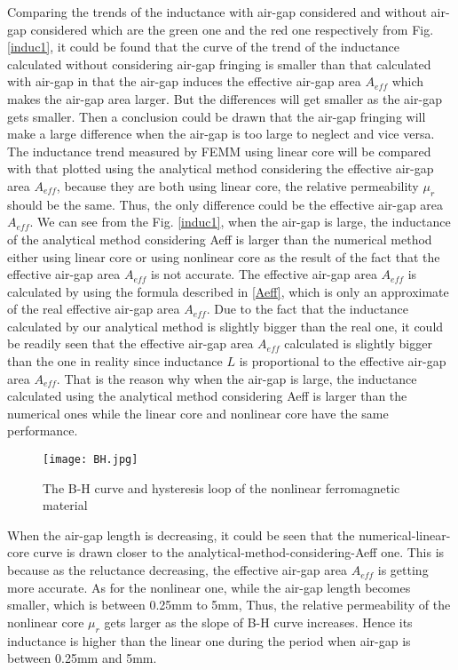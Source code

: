 \documentclass[a4paper]{IEEEtran}
\begin{document}
{Comparing the trends of the inductance with air-gap considered and without air-gap considered which are the green one and the red one respectively from Fig. {\ref{induc1}}, 
it could be found that the curve of the trend of the inductance calculated without considering air-gap fringing is smaller than that calculated with air-gap in that the air-gap induces the effective air-gap area $A_{eff}$ which makes the air-gap area larger. 
But the differences will get smaller as the air-gap gets smaller. Then a conclusion could be drawn that the air-gap fringing will make a large difference when the air-gap is too large to neglect and vice versa.
The inductance trend measured by FEMM using linear core will be compared with that plotted using the analytical method considering the effective air-gap area $A_{eff}$,
because they are both using linear core, the relative permeability $\mu_r$ should be the same. Thus, the only difference could be the effective air-gap area $A_{eff}$. We can see from the Fig. {\ref{induc1}}, when the air-gap is large, 
the inductance of the analytical method considering Aeff is larger than the numerical method either using linear core or using nonlinear core as the result of the fact that the effective air-gap area $A_{eff}$ is not accurate. The effective air-gap area $A_{eff}$ is calculated
by using the formula described in \eqref{Aeff}, which is only an approximate of the real effective air-gap area $A_{eff}$. Due to the fact that the inductance calculated by our analytical method is slightly bigger than the real one,
it could be readily seen that the effective air-gap area $A_{eff}$ calculated is slightly bigger than the one in reality since inductance $L$ is proportional to the effective air-gap area $A_{eff}$.
That is the reason why when the air-gap is large, the inductance calculated using the analytical method considering Aeff is larger than the numerical ones while the linear core and nonlinear core have the same performance.\par
\begin{figure}[H]
\centering
\texttt{[image: BH.jpg]}
\caption{The B-H curve and hysteresis loop of the nonlinear ferromagnetic material\label{BH}}\par
\end{figure} 
When the air-gap length is decreasing, it could be seen that the numerical-linear-core curve is drawn closer to the analytical-method-considering-Aeff one.
This is because as the reluctance decreasing, 
the effective air-gap area $A_{eff}$ is getting more accurate.
As for the nonlinear one, while the air-gap length becomes smaller, which is between 0.25mm to 5mm,
Thus, the relative permeability of the nonlinear core $\mu_r$ gets larger as the slope of B-H curve increases.
Hence its inductance is higher than the linear one during the period when air-gap is between 0.25mm and 5mm. 

}
\end{document}
